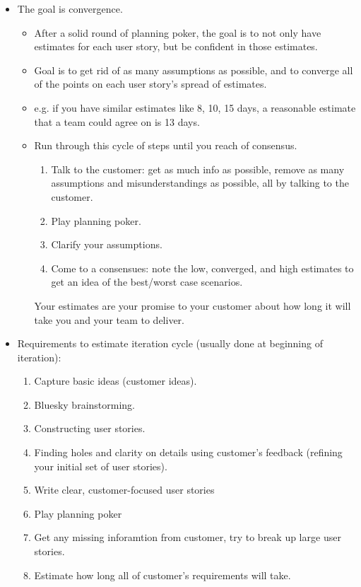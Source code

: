 \documentclass[letterpaper]{article}
\begin{document}
\begin{itemize}
    \item The goal is convergence. 
    \begin{itemize}
        \item After a solid round of planning poker, the goal is to not only have estimates for each user story, but be confident in those estimates. 
        \item Goal is to get rid of as many assumptions as possible, and to converge all of the points on each user story's spread of estimates. 
        \item e.g. if you have similar estimates like 8, 10, 15 days, a reasonable estimate that a team could agree on is 13 days. 
        \item Run through this cycle of steps until you reach of consensus. 
        \begin{enumerate}
            \item Talk to the customer: get as much info as possible, remove as many assumptions and misunderstandings as possible, all by talking to the customer. 
            \item Play planning poker. 
            \item Clarify your assumptions. 
            \item Come to a consensues: note the low, converged, and high estimates to get an idea of the best/worst case scenarios. 
        \end{enumerate}
        \begin{mdframed}
            Your estimates are your promise to your customer about how long it will take you and your team to deliver.
        \end{mdframed}
    \end{itemize}

    \item Requirements to estimate iteration cycle (usually done at beginning of iteration):
    \begin{enumerate}
        \item Capture basic ideas (customer ideas).
        \item Bluesky brainstorming. 
        \item Constructing user stories. 
        \item Finding holes and clarity on details using customer's feedback (refining your initial set of user stories). 
        \item Write clear, customer-focused user stories
        \item Play planning poker 
        \item Get any missing inforamtion from customer, try to break up large user stories. 
        \item Estimate how long all of customer's requirements will take. 
    \end{enumerate}


\end{itemize}
\end{document}
